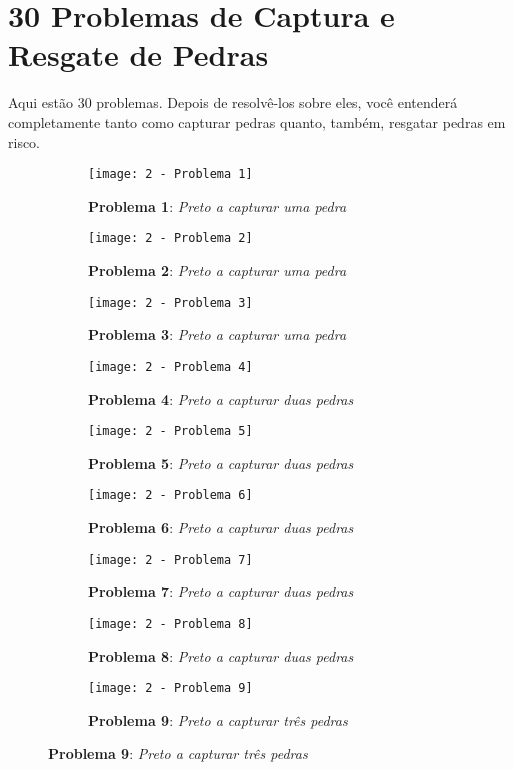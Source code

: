 \pagebreak

\section{30 Problemas de Captura e Resgate de Pedras}

Aqui estão 30 problemas. Depois de resolvê-los sobre eles, você entenderá completamente tanto como capturar pedras quanto, também, resgatar pedras em risco.

\begin{figure}[h!]
    \centering
    \captionsetup{justification=raggedright,singlelinecheck=false}
    \begin{subfigure}[t]{.3\textwidth}
        \texttt{[image: 2 - Problema 1]}
        \caption*{\textbf{Problema 1}: \emph{Preto a capturar uma pedra}}
    \end{subfigure}
    \hfill
    \begin{subfigure}[t]{.3\textwidth}
        \texttt{[image: 2 - Problema 2]}
        \caption*{\textbf{Problema 2}: \emph{Preto a capturar uma pedra}}
    \end{subfigure}
    \hfill
    \begin{subfigure}[t]{.3\textwidth}
        \texttt{[image: 2 - Problema 3]}
        \caption*{\textbf{Problema 3}: \emph{Preto a capturar uma pedra}}
    \end{subfigure}
    \par\bigskip
    \begin{subfigure}[t]{.3\textwidth}
        \texttt{[image: 2 - Problema 4]}
        \caption*{\textbf{Problema 4}: \emph{Preto a capturar duas pedras}}
    \end{subfigure}
    \hfill
    \begin{subfigure}[t]{.3\textwidth}
        \texttt{[image: 2 - Problema 5]}
        \caption*{\textbf{Problema 5}: \emph{Preto a capturar duas pedras}}
    \end{subfigure}
    \hfill
    \begin{subfigure}[t]{.3\textwidth}
        \texttt{[image: 2 - Problema 6]}
        \caption*{\textbf{Problema 6}: \emph{Preto a capturar duas pedras}}
    \end{subfigure}
    \par\bigskip
    \begin{subfigure}[t]{.3\textwidth}
        \texttt{[image: 2 - Problema 7]}
        \caption*{\textbf{Problema 7}: \emph{Preto a capturar duas pedras}}
    \end{subfigure}
    \hfill
    \begin{subfigure}[t]{.3\textwidth}
        \texttt{[image: 2 - Problema 8]}
        \caption*{\textbf{Problema 8}: \emph{Preto a capturar duas pedras}}
    \end{subfigure}
    \hfill
    \begin{subfigure}[t]{.3\textwidth}
        \texttt{[image: 2 - Problema 9]}
        \caption*{\textbf{Problema 9}: \emph{Preto a capturar três pedras}}
    \end{subfigure}
\end{figure}

